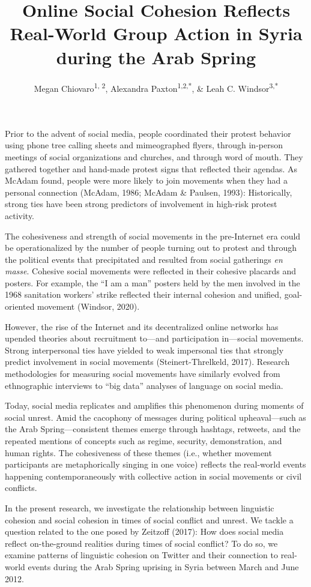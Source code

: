 \documentclass[
  english,
  man]{apa6}
\author{Megan Chiovaro\textsuperscript{1, 2}, Alexandra Paxton\textsuperscript{1,2,*}, \& Leah C. Windsor\textsuperscript{3,*}}
\affiliation{
\vspace{0.5cm}
\textsuperscript{1} Center for the Ecological Study of Perception and Action, University of Connecticut\\\textsuperscript{2} Department of Psychological Sciences, University of Connecticut\\\textsuperscript{3} University of Memphis\\\textsuperscript{*} Equal author contributions}
\title{Online Social Cohesion Reflects Real-World Group Action in Syria during the Arab Spring}
\date{}
\begin{document}
\maketitle

Prior to the advent of social media, people coordinated their protest behavior
using phone tree calling sheets and mimeographed flyers, through in-person
meetings of social organizations and churches, and through word of mouth. They
gathered together and hand-made protest signs that reflected their agendas. As
McAdam found, people were more likely to join movements when they had a personal
connection (McAdam, 1986; McAdam \& Paulsen, 1993): Historically, strong
ties have been strong predictors of involvement in high-risk protest activity.

The cohesiveness and strength of social movements in the pre-Internet era could
be operationalized by the number of people turning out to protest and through
the political events that precipitated and resulted from social gatherings \emph{en
masse}. Cohesive social movements were reflected in their cohesive placards and
posters. For example, the \enquote{I am a man} posters held by the men involved in the
1968 sanitation workers' strike reflected their internal cohesion and unified,
goal-oriented movement (Windsor, 2020).

However, the rise of the Internet and its decentralized online networks has
upended theories about recruitment to---and participation in---social movements.
Strong interpersonal ties have yielded to weak impersonal ties that strongly
predict involvement in social movements (Steinert-Threlkeld, 2017). Research
methodologies for measuring social movements have similarly evolved from
ethnographic interviews to \enquote{big data} analyses of language on social media.

Today, social media replicates and amplifies this phenomenon during moments of
social unrest. Amid the cacophony of messages during political upheaval---such
as the Arab Spring---consistent themes emerge through hashtags, retweets, and
the repeated mentions of concepts such as regime, security, demonstration, and
human rights. The cohesiveness of these themes (i.e., whether movement
participants are metaphorically singing in one voice) reflects the real-world
events happening contemporaneously with collective action in social movements or
civil conflicts.

In the present research, we investigate the relationship between linguistic
cohesion and social cohesion in times of social conflict and unrest. We tackle a
question related to the one posed by Zeitzoff (2017): How does
social media reflect on-the-ground realities during times of social conflict? To
do so, we examine patterns of linguistic cohesion on Twitter and their
connection to real-world events during the Arab Spring uprising in Syria between
March and June 2012.
\end{document}
